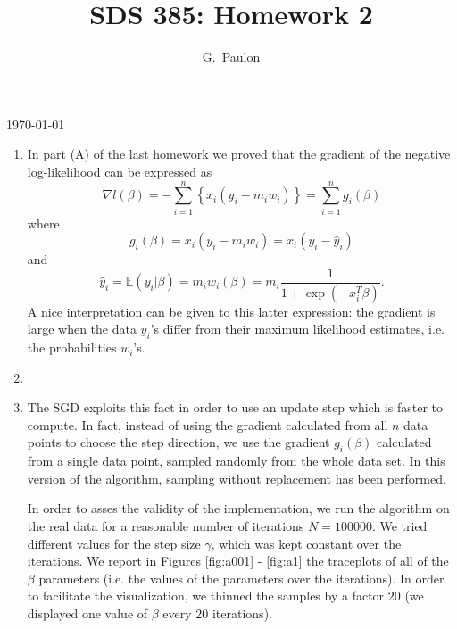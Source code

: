 \documentclass{homework}
\title{SDS 385: Homework 2}
\author{G.~Paulon}
\begin{document}
\makeatletter
\begin{titlepage}
	\vspace*{\fill}
	\centering
	{\huge \@title \par}
	\vskip0.5cm
	{\large \@author \par}
	\vskip0.5cm
	{\large \today \par}
	\vspace*{\fill}
\end{titlepage}
\makeatother

\newpage 
\mbox{}
\thispagestyle{empty}
\newpage

\setcounter{page}{1}


\begin{enumerate}[label=(\Alph*)]

\item In part (A) of the last homework we proved that the gradient of the negative log-likelihood can be expressed as
\begin{equation*}
\nabla l(\beta) = - \sum_{i=1}^n \left\lbrace x_i (y_i - m_i w_i) \right\rbrace = \sum_{i=1}^n g_i (\beta)
\end{equation*}
where
\begin{equation*}
g_i (\beta) = x_i (y_i - m_i w_i) = x_i (y_i - \hat{y}_i)
\end{equation*}
and
\begin{equation*}
\hat{y}_i = \mathbb{E} (y_i | \beta) = m_i w_i (\beta) = m_i \frac{1}{1+\exp(-x_i^T \beta)}.
\end{equation*}
A nice interpretation can be given to this latter expression: the gradient is large when the data $y_i$'s differ from their maximum likelihood estimates, i.e. the probabilities $w_i$'s.

\item

\item The SGD exploits this fact in order to use an update step which is faster to compute. In fact, instead of using the gradient calculated from all $n$ data points to choose the step direction, we use the gradient $g_i(\beta)$ calculated from a single data point, sampled randomly from the whole data set. In this version of the algorithm, sampling without replacement has been performed. 

In order to asses the validity of the implementation, we run the algorithm on the real data for a reasonable number of iterations $N = 100000$. We tried different values for the step size $\gamma$, which was kept constant over the iterations. We report in Figures \ref{fig:a001} - \ref{fig:a1} the traceplots of all of the $\beta$ parameters (i.e. the values of the parameters over the iterations). In order to facilitate the visualization, we thinned the samples by a factor $20$ (we displayed one value of $\beta$ every $20$ iterations). 


\end{enumerate}
\end{document}
